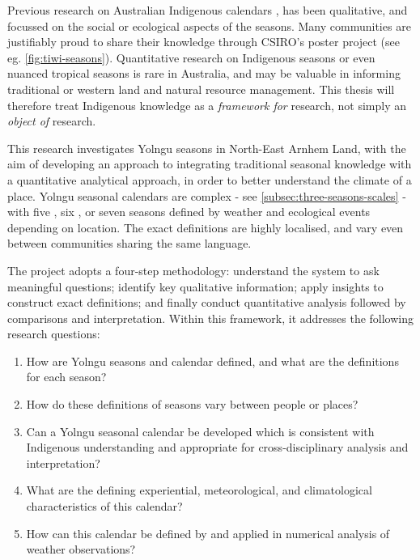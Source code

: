 

Previous research on Australian Indigenous calendars ,
\citep{CSIROcals,clarke2009,davis1989,atlas2014}
has been qualitative, and focussed on the social or ecological aspects of
the seasons.  Many communities are justifiably proud to share
their knowledge through CSIRO's poster project (see eg. \cref{fig:tiwi-seasons}).
Quantitative research on Indigenous seasons or even nuanced tropical seasons
is rare in Australia, and may be valuable in informing traditional or western
land and natural resource management.  This thesis will therefore treat
Indigenous knowledge as a \emph{framework for} research, not simply an
\emph{object of} research.


This research investigates Yolngu seasons in North-East Arnhem Land, with the
aim of developing an approach to integrating traditional seasonal knowledge
with a quantitative analytical approach, in order to better understand the climate
of a place.  Yolngu seasonal calendars are complex - see
\cref{subsec:three-seasons-scales} - with five \citep{davis1989}, six
\citep{atlas2014}, or seven \citep{barber2005} seasons defined by weather and
ecological events depending on location.  The exact definitions are highly localised,
and vary even between communities sharing the same language.

The project adopts a four-step methodology:  understand the system to ask
meaningful questions; identify key qualitative information; apply insights to
construct exact definitions; and finally conduct quantitative analysis
followed by comparisons and interpretation.  Within this framework, it
addresses the following research questions:
\begin{enumerate}
\item How are Yolngu seasons and calendar defined, and what are the definitions for each season?
\item How do these definitions of seasons vary between people or places?
\item Can a Yolngu seasonal calendar be developed which is consistent with Indigenous
    understanding and appropriate for cross-disciplinary analysis and interpretation?
\item What are the defining experiential, meteorological, and climatological
    characteristics of this calendar?
\item How can this calendar be defined by and applied in numerical analysis of weather observations?
\end{enumerate}

